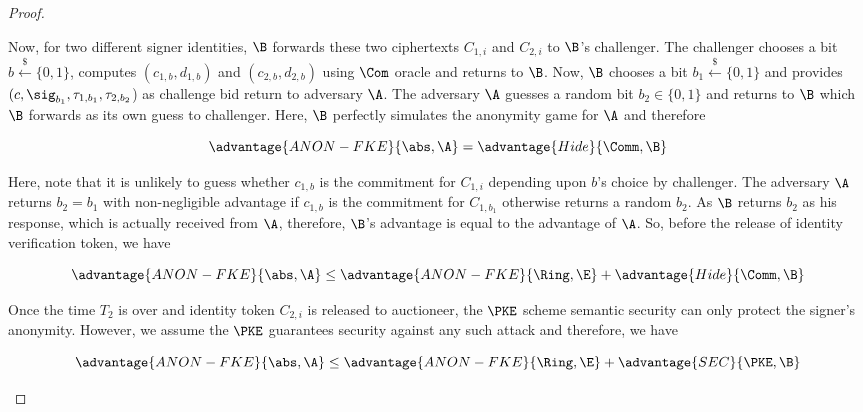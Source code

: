 \begin{proof}
\begin{description}
    Now, for two different signer identities, $\B$ forwards these two ciphertexts $C_{1,i}$ and $C_{2,i}$ to $\B$'s challenger. The challenger chooses a bit $b\overset{\$}{\gets}\{0,1\}$, computes $(c_{1,b},d_{1,b})$ and $(c_{2,b},d_{2,b})$ using $\Com$ oracle and returns to $\B$. 
    Now, $\B$ chooses a bit $b_1\overset{\$}{\gets}\{0,1\}$ and provides $(c, \sig_{b_1}, \tau_{1,b_1}, \tau_{2,b_2}$) as challenge bid return to adversary $\A$. The adversary $\A$ guesses a random bit
    $b_2\in\{0,1\}$ and returns to $\B$ which $\B$ forwards as its own
    guess to challenger. Here, $\B$ perfectly simulates the anonymity
    game for $\A$ and therefore
    
    \begin{equation*}
        \advantage{ANON-FKE}{\abs, \A} = \advantage{Hide}{\Comm, \B}
    \end{equation*}
    
    Here, note that it is unlikely to guess whether $c_{1,b}$ is the
    commitment for $C_{1,i}$ depending upon $b$'s choice by
    challenger. The adversary $\A$ returns $b_2=b_1$ with
    non-negligible advantage if $c_{1,b}$ is the commitment for
    $C_{1,b_1}$ otherwise returns a random $b_2$. As $\B$ returns
    $b_2$ as his response, which is actually received from $\A$,
    therefore, $\B$'s advantage is equal to the advantage of $\A$. So,
    before the release of identity verification token, we have

    \begin{equation*}
        \advantage{ANON-FKE}{\abs, \A} \leq \advantage{ANON-FKE}{\Ring, \E} + \advantage{Hide}{\Comm, \B}
    \end{equation*}
    
    Once the time $T_2$ is over and identity token $C_{2,i}$ is
    released to auctioneer, the $\PKE$ scheme semantic security can
    only protect the signer's anonymity. However, we assume the $\PKE$ guarantees security against any such attack and therefore, we have
    
    \begin{equation*}
        \advantage{ANON-FKE}{\abs, \A} \leq \advantage{ANON-FKE}{\Ring, \E} + \advantage{SEC}{\PKE, \B}
    \end{equation*}
    
  \end{description}
\end{proof}

